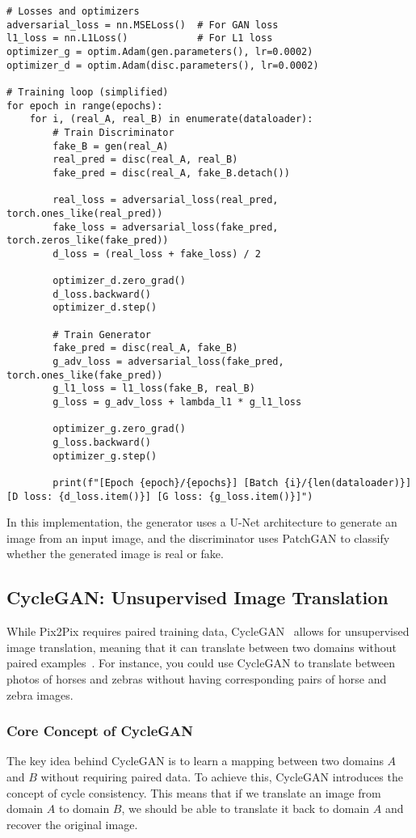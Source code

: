\begin{lstlisting}[style=python]
# Losses and optimizers
adversarial_loss = nn.MSELoss()  # For GAN loss
l1_loss = nn.L1Loss()            # For L1 loss
optimizer_g = optim.Adam(gen.parameters(), lr=0.0002)
optimizer_d = optim.Adam(disc.parameters(), lr=0.0002)

# Training loop (simplified)
for epoch in range(epochs):
    for i, (real_A, real_B) in enumerate(dataloader):
        # Train Discriminator
        fake_B = gen(real_A)
        real_pred = disc(real_A, real_B)
        fake_pred = disc(real_A, fake_B.detach())
        
        real_loss = adversarial_loss(real_pred, torch.ones_like(real_pred))
        fake_loss = adversarial_loss(fake_pred, torch.zeros_like(fake_pred))
        d_loss = (real_loss + fake_loss) / 2
        
        optimizer_d.zero_grad()
        d_loss.backward()
        optimizer_d.step()
        
        # Train Generator
        fake_pred = disc(real_A, fake_B)
        g_adv_loss = adversarial_loss(fake_pred, torch.ones_like(fake_pred))
        g_l1_loss = l1_loss(fake_B, real_B)
        g_loss = g_adv_loss + lambda_l1 * g_l1_loss
        
        optimizer_g.zero_grad()
        g_loss.backward()
        optimizer_g.step()

        print(f"[Epoch {epoch}/{epochs}] [Batch {i}/{len(dataloader)}] [D loss: {d_loss.item()}] [G loss: {g_loss.item()}]")
\end{lstlisting}

In this implementation, the generator uses a U-Net architecture to generate an image from an input image, and the discriminator uses PatchGAN to classify whether the generated image is real or fake.

\subsection{CycleGAN: Unsupervised Image Translation}
While Pix2Pix requires paired training data, CycleGAN~\cite{chu2017cyclegan} allows for unsupervised image translation, meaning that it can translate between two domains without paired examples~\cite{zhu2017unpaired}. For instance, you could use CycleGAN to translate between photos of horses and zebras without having corresponding pairs of horse and zebra images.

\subsubsection{Core Concept of CycleGAN}
The key idea behind CycleGAN is to learn a mapping between two domains \( A \) and \( B \) without requiring paired data. To achieve this, CycleGAN introduces the concept of cycle consistency. This means that if we translate an image from domain \( A \) to domain \( B \), we should be able to translate it back to domain \( A \) and recover the original image.

